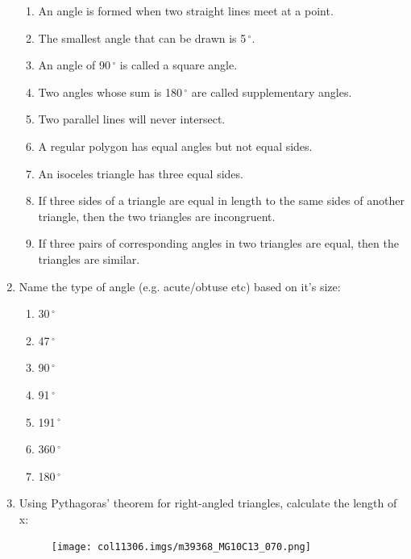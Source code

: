 \begin{enumerate}[noitemsep, label=\textbf{\arabic*}. ]
\label{m39368*id401234}\begin{enumerate}[noitemsep, label=\textbf{\alph*}. ] 
            \item An angle is formed when two straight lines meet at a point.	\item The smallest angle that can be drawn is 5\ensuremath{{\,}^{\circ}}.\item An angle of 90\ensuremath{{\,}^{\circ}} is called a square angle.\item Two angles whose sum is 180\ensuremath{{\,}^{\circ}} are called supplementary angles.\item Two parallel lines will never intersect.\item A regular polygon has equal angles but not equal sides.\item An isoceles triangle has three equal sides.\item If three sides of a triangle are equal in length to the same sides of another triangle, then the two triangles are incongruent.\item If three pairs of corresponding angles in two triangles are equal, then the triangles are similar.\end{enumerate}
\label{m39368*uid143}\item Name the type of angle (e.g. acute/obtuse etc) based on it's size:
\label{m39368*id401235}\begin{enumerate}[noitemsep, label=\textbf{\alph*}. ] 
            \item  30\ensuremath{{\,}^{\circ}}\item  47\ensuremath{{\,}^{\circ}}\item  90\ensuremath{{\,}^{\circ}}\item  91\ensuremath{{\,}^{\circ}}\item  191\ensuremath{{\,}^{\circ}}\item  360\ensuremath{{\,}^{\circ}}\item  180\ensuremath{{\,}^{\circ}}\end{enumerate}
\label{m39368*uid144}\item Using Pythagoras' theorem for right-angled triangles, calculate the length of x:
    \setcounter{subfigure}{0}
	\begin{figure}[H] %
    \begin{center}
    \label{m39368*id401236!!!underscore!!!media}\label{m39368*id401236!!!underscore!!!printimage}\texttt{[image: col11306.imgs/m39368\_MG10C13\_070.png]} %
      \vspace{2pt}
    \vspace{.1in}
    \end{center}
 \end{figure}       
\end{enumerate}
